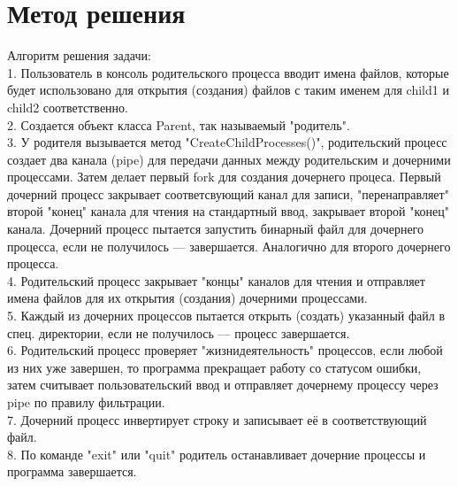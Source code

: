 \section{Метод решения}
Алгоритм решения задачи: \\ 

1. Пользователь в консоль родительского процесса вводит имена файлов, которые будет использовано для открытия (создания) файлов с таким именем для child1 и child2 соответственно. \\

2. Создается объект класса Parent, так называемый "родитель". \\

3. У родителя вызывается метод "CreateChildProcesses()", родительский процесс создает два канала (pipe) для передачи данных между родительским и дочерними процессами. 
Затем делает первый fork для создания дочернего процеса. Первый дочерний процесс закрывает соответсвующий канал для записи, "перенаправляет" второй "конец" канала для чтения на стандартный ввод, закрывает второй "конец" канала. 
Дочерний процесс пытается запустить бинарный файл для дочернего процесса, если не получилось --- завершается. Аналогично для второго дочернего процесса. \\

4. Родительский процесс закрывает "концы" каналов для чтения и отправляет имена файлов для их открытия (создания) дочерними процессами. \\ 

5. Каждый из дочерних процессов пытается открыть (создать) указанный файл в спец. директории, если не получилось --- процесс завершается. \\

6. Родительский процесс проверяет "жизнидеятельность" процессов, если любой из них уже завершен, то программа прекращает работу со статусом ошибки, 
затем считывает пользовательский ввод и отправляет дочернему процессу через pipe по правилу фильтрации. \\

7. Дочерний процесс инвертирует строку и записывает её в соответствующий файл. \\

8. По команде "exit" или "quit" родитель останавливает дочерние процессы и программа завершается. \\

